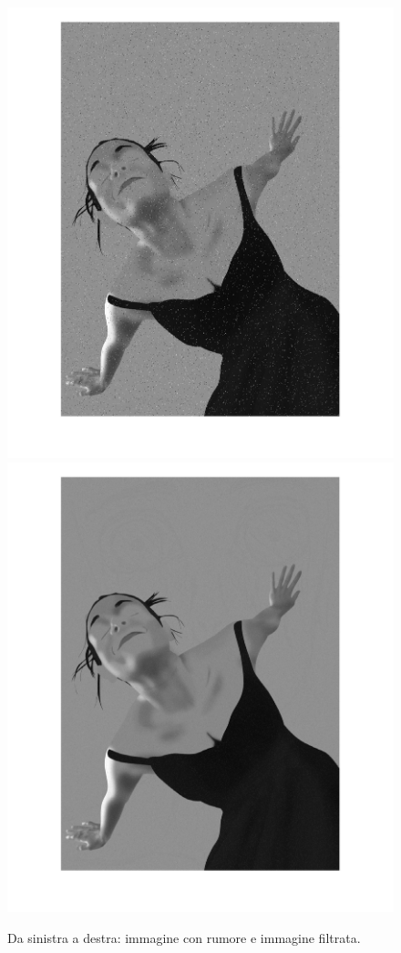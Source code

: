 \begin{figure}[htb] \centering
\includegraphics[scale=0.25,trim={5cm 0 2.5cm 0},clip]{Pictures/Esempi di utilizzo/Esempio 1/Amira_con_rumore.png}
\includegraphics[scale=0.25,trim={2.5cm 0 5cm 0},clip]{Pictures/Esempi di utilizzo/Esempio 1/Amira_filtrata.png}
\caption{Da sinistra a destra: immagine con rumore e immagine filtrata.}\label{fig:figura}
\end{figure} 
